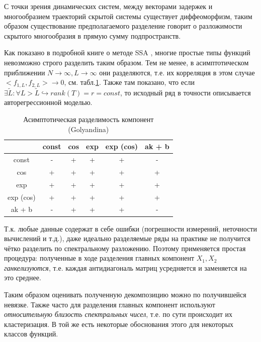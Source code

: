 	    	 С точки зрения динамических систем, между векторами задержек и многообразием траекторий скрытой системы существует диффеоморфизм, таким образом существование предполагаемого разделение говорит о разложимости скрытого многообразия в прямую сумму подпространств.
	    	
	    	Как показано в подробной книге о методе SSA \cite{ecfb9dc578be43ae9ee8fc88b8ff9151}, многие простые типы функций невозможно строго разделить таким образом. Тем не менее, в асимптотическом приближении $ N \to \infty, L \to \infty $ они разделяются, т.е. их корреляция в этом случае $ <f_{1, L}, f_{2, L}> \to 0 $, см. табл.\ref{tab:asympt_devis}. Также там показано, что если $ \exists \tilde{L}: \forall L > \tilde{L} \hookrightarrow rank(T) = r = const $, то исходный ряд в точности описывается авторегрессионной моделью.
	    	
	    	\begin{table}[h]
	    		\centering
	    		\caption{Асимптотическая разделимость компонент (Golyandina)}\label{tab:asympt_devis}
	    		\begin{tabular}{|c|c|c|c|c|c|}
	    			\hline
	    			& const & cos & exp & exp (cos) & ak + b \\ \hline
	    			const     & -     & +   & +   & +         & -      \\ \hline
	    			cos       & +     & +   & +   & +         & +      \\ \hline
	    			exp       & +     & +   & +   & +         & +      \\ \hline
	    			exp (cos) & +     & +   & +   & +         & +      \\ \hline
	    			ak + b    & -     & +   & +   & +         & -      \\ \hline
	    		\end{tabular}
	    	\end{table}
	    	
	    	Т.к. любые данные содержат в себе ошибки (погрешности измерений, неточности вычислений и т.д.), даже идеально разделяемые ряды на практике не получится чётко разделить по спектральному разложению. Поэтому применяется простая процедура: полученные в ходе разделения главных компонент $ X_1, X_2 $ \textit{ганкелизуются}, т.е. каждая антидиагональ матриц усредняется и заменяется на это среднее.
	    	
	    	
	    	Таким образом оценивать полученную декомпозицию можно по получившейся невязке. Также часто для разделения главных компонент используют \textit{относительную близость спектральных чисел}, т.е. по сути происходит их кластеризация. В той же \cite{ecfb9dc578be43ae9ee8fc88b8ff9151} есть некоторые обоснования этого для некоторых классов функций.
	    	
